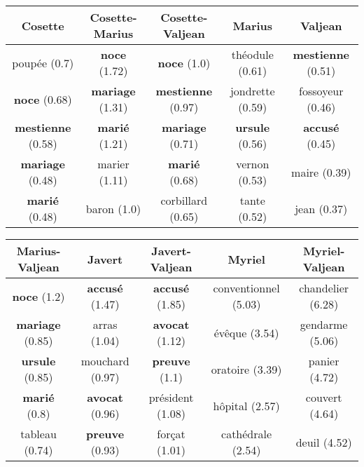 \documentclass[
twocolumn,
]{ceurart}
\begin{document}
\begin{table*}[!bh]
	\centering
	\begin{tabular}{|c|c|c|c|c|}
		\hline
		Cosette & Cosette-Marius & Cosette-Valjean & Marius & Valjean \\ \hline
		poupée (0.7) & \textbf{noce} (1.72) & \textbf{noce} (1.0) & théodule (0.61) & \textbf{mestienne} (0.51) \\ \hline
		\textbf{noce} (0.68) & \textbf{mariage} (1.31) & \textbf{mestienne} (0.97) & jondrette (0.59) & fossoyeur (0.46) \\ \hline
		\textbf{mestienne} (0.58) & \textbf{marié} (1.21) & \textbf{mariage} (0.71) & \textbf{ursule} (0.56) & \textbf{accusé} (0.45) \\ \hline
		\textbf{mariage} (0.48) & marier (1.11) & \textbf{marié} (0.68) & vernon (0.53) & maire (0.39) \\ \hline
		\textbf{marié} (0.48) & baron (1.0) & corbillard (0.65) & tante (0.52) & jean (0.37) \\ 
		\hline
	\end{tabular}

	\begin{tabular}{|c|c|c|c|c|}
		\hline
		Marius-Valjean & Javert & Javert-Valjean & Myriel & Myriel-Valjean \\ \hline
		\textbf{noce} (1.2) & \textbf{accusé} (1.47) & \textbf{accusé} (1.85) & conventionnel (5.03) & chandelier (6.28) \\ \hline
		\textbf{mariage} (0.85) & arras (1.04) & \textbf{avocat} (1.12) & évêque (3.54) & gendarme (5.06) \\ \hline
		\textbf{ursule} (0.85) & mouchard (0.97) & \textbf{preuve} (1.1) & oratoire (3.39) & panier (4.72) \\ \hline
		\textbf{marié} (0.8) & \textbf{avocat} (0.96) & président (1.08) & hôpital (2.57) & couvert (4.64) \\ \hline
		tableau (0.74) & \textbf{preuve} (0.93) & forçat (1.01) & cathédrale (2.54) & deuil (4.52) \\ \hline
	\end{tabular}
	
	\label{CA_CENT_word_vs_obj}
	\caption{The 5 most associated words (similarity in parentheses) to a selected set of characters and character pairs, regarding the \textbf{CA-CENT} method. Words appearing at least two times are in bold.}
\end{table*}
\end{document}
